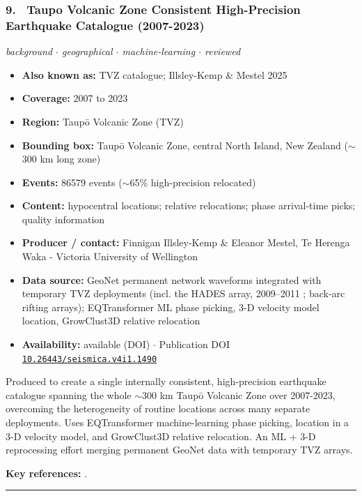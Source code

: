 \documentclass[10pt,a4paper]{article}
\newcommand{\catentryrule}{\par\vspace{3pt}\noindent\textcolor{rulegrey}{\rule{\linewidth}{0.3pt}}\par\vspace{5pt}}
\newcommand{\kv}[2]{\item \textbf{#1:} #2}
\begin{document}
\subsubsection*{\hypertarget{c:9}{9.}~ Taupo Volcanic Zone Consistent High-Precision Earthquake Catalogue (2007-2023)}
{\small\itshape background $\cdot$ geographical $\cdot$ machine-learning $\cdot$ reviewed}\par\vspace{2pt}
\begin{itemize}[leftmargin=1.3em,itemsep=0.6pt,topsep=1pt,parsep=0pt]
\kv{Also known as}{TVZ catalogue; Illsley-Kemp \& Mestel 2025}
\kv{Coverage}{2007 to 2023}
\kv{Region}{Taupō Volcanic Zone (TVZ)}
\kv{Bounding box}{Taupō Volcanic Zone, central North Island, New Zealand ($\sim$300 km long zone)}
\kv{Events}{86579 events ($\sim$65\% high-precision relocated)}
\kv{Content}{hypocentral locations; relative relocations; phase arrival-time picks; quality information}
\kv{Producer / contact}{Finnigan Illsley-Kemp \& Eleanor Mestel, Te Herenga Waka - Victoria University of Wellington}
\kv{Data source}{GeoNet permanent network waveforms integrated with temporary TVZ deployments (incl. the HADES array, 2009--2011 \cite{Bannister2025}; back-arc rifting arrays); EQTransformer ML phase picking, 3-D velocity model location, GrowClust3D relative relocation}
\kv{Availability}{available (DOI) $\cdot$ Publication DOI \href{https://doi.org/10.26443/seismica.v4i1.1490}{\nolinkurl{10.26443/seismica.v4i1.1490}}}
\end{itemize}
\par\vspace{2pt}Produced to create a single internally consistent, high-precision earthquake catalogue spanning the whole $\sim$300 km Taupō Volcanic Zone over 2007-2023, overcoming the heterogeneity of routine locations across many separate deployments. Uses EQTransformer machine-learning phase picking, location in a 3-D velocity model, and GrowClust3D relative relocation. An ML + 3-D reprocessing effort merging permanent GeoNet data with temporary TVZ arrays.
\par\vspace{2pt}\textbf{Key references:} \cite{IllsleyKemp2025}.
\catentryrule
\end{document}
